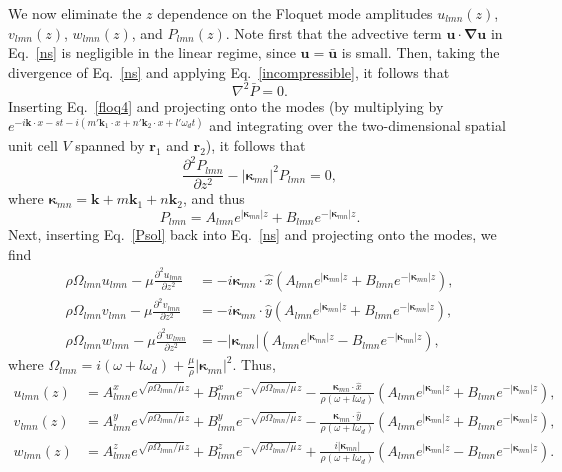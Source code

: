 \documentclass[aps,pre,amsmath,amssymb,floatfix,onecolumn,notitlepage,10pt]{revtex4-1}
\begin{document}
We now eliminate the $z$ dependence on the Floquet mode amplitudes $u_{lmn}(z)$, $v_{lmn}(z)$, $w_{lmn}(z)$, and $P_{lmn}(z)$. Note first that the advective term $\mathbf{u}\cdot\bm{\nabla}\mathbf{u}$ in Eq.~\eqref{ns} is negligible in the linear regime, since $\mathbf{u}=\bar{\mathbf{u}}$ is small. Then, taking the divergence of Eq.~\eqref{ns} and applying Eq.~\eqref{incompressible}, it follows that
\begin{equation}
\nabla^2 \bar{P}=0. \nonumber
\end{equation}
Inserting Eq.~\eqref{floq4} and projecting onto the modes (by multiplying by $e^{-i\mathbf{k}\cdot x-st-i(m'\mathbf{k}_1\cdot x+n'\mathbf{k}_2\cdot x+l'\omega_d t)}$ and integrating over the two-dimensional spatial unit cell $V$ spanned by $\mathbf{r}_1$ and $\mathbf{r}_2$), it follows that
\begin{equation}
\frac{\partial^2 P_{lmn}}{\partial z^2} - \left |\bm{\kappa}_{mn}\right|^2 P_{lmn} = 0, \nonumber
\end{equation}
where $\bm{\kappa}_{mn} = \mathbf{k} + m\mathbf{k}_1 + n\mathbf{k}_2$, and thus
\begin{equation}
P_{lmn} = A_{lmn}e^{|\bm{\kappa}_{mn}|z} + B_{lmn}e^{-|\bm{\kappa}_{mn}|z}. \label{Psol}
\end{equation}
Next, inserting Eq.~\eqref{Psol} back into Eq.~\eqref{ns} and projecting onto the modes, we find
\begin{align}
\rho\Omega_{lmn} u_{lmn} - \mu\frac{\partial ^2 u_{lmn}}{\partial z^2} &= -i\bm{\kappa}_{mn}\cdot \hat{x} (A_{lmn}e^{|\bm{\kappa}_{mn}|z} + B_{lmn}e^{-|\bm{\kappa}_{mn}|z}), \nonumber \\
\rho\Omega_{lmn} v_{lmn}  - \mu\frac{\partial ^2 v_{lmn}}{\partial z^2} &= -i\bm{\kappa}_{mn}\cdot \hat{y} (A_{lmn}e^{|\bm{\kappa}_{mn}|z} + B_{lmn}e^{-|\bm{\kappa}_{mn}|z}), \nonumber \\
\rho\Omega_{lmn} w_{lmn}  - \mu\frac{\partial ^2 w_{lmn}}{\partial z^2} &= -|\bm{\kappa}_{mn}| (A_{lmn}e^{|\bm{\kappa}_{mn}|z} - B_{lmn}e^{-|\bm{\kappa}_{mn}|z}), \nonumber
\end{align}
where $\Omega_{lmn} = i(\omega+l \omega_d) + \frac{\mu}{\rho} |\bm{\kappa}_{mn}|^2$. Thus,
\begin{align}
u_{lmn}(z) &= A^x_{lmn} e^{\sqrt{\rho\Omega_{lmn}/\mu}z} + B^x_{lmn} e^{-\sqrt{\rho\Omega_{lmn}/\mu}z} - \frac{\bm{\kappa}_{mn}\cdot \hat{x}}{\rho(\omega+l\omega_d)}(A_{lmn}e^{|\bm{\kappa}_{mn}|z} + B_{lmn}e^{-|\bm{\kappa}_{mn}|z}), \label{usol} \\
v_{lmn}(z) &= A^y_{lmn} e^{\sqrt{\rho\Omega_{lmn}/\mu}z} + B^y_{lmn} e^{-\sqrt{\rho\Omega_{lmn}/\mu}z} - \frac{\bm{\kappa}_{mn}\cdot \hat{y}}{\rho(\omega+l\omega_d)}(A_{lmn}e^{|\bm{\kappa}_{mn}|z} + B_{lmn}e^{-|\bm{\kappa}_{mn}|z}), \label{vsol} \\
w_{lmn}(z) &= A^z_{lmn} e^{\sqrt{\rho\Omega_{lmn}/\mu}z} + B^z_{lmn} e^{-\sqrt{\rho\Omega_{lmn}/\mu}z} + \frac{i|\bm{\kappa}_{mn}|}{\rho(\omega+l\omega_d)}(A_{lmn}e^{|\bm{\kappa}_{mn}|z} - B_{lmn}e^{-|\bm{\kappa}_{mn}|z}). \label{wsol}
\end{align}
\end{document}
